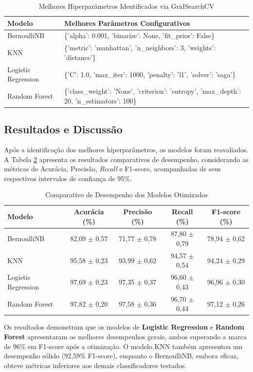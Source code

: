 \begin{table}[htbp]
\centering
\caption{Melhores Hiperparâmetros Identificados via GridSearchCV}
\label{tab:melhores_parametros}
\begin{tabular}{|l|p{10cm}|}
\hline
\textbf{Modelo} & \textbf{Melhores Parâmetros Configurativos} \\ \hline
BernoulliNB & \{'alpha': 0.001, 'binarize': None, 'fit\_prior': False\} \\ \hline
KNN & \{'metric': 'manhattan', 'n\_neighbors': 3, 'weights': 'distance'\} \\ \hline
Logistic Regression & \{'C': 1.0, 'max\_iter': 1000, 'penalty': 'l1', 'solver': 'saga'\} \\ \hline
Random Forest & \{'class\_weight': 'None', 'criterion': 'entropy', 'max\_depth': 20, 'n\_estimators': 100\} \\ \hline
\end{tabular}
\end{table}

\subsection{Resultados e Discussão} \label{subsec:resultados}

Após a identificação dos melhores hiperparâmetros, os modelos foram reavaliados. A Tabela \ref{tab:comparativo_modelos} apresenta os resultados comparativos de desempenho, considerando as métricas de Acurácia, Precisão, \textit{Recall} e F1-score, acompanhadas de seus respectivos intervalos de confiança de 95\%.

\begin{table}[htbp]
	\centering
	\caption{Comparativo de Desempenho dos Modelos Otimizados}
	\label{tab:comparativo_modelos}
	\begin{tabular}{|l|c|c|c|c|}
		\hline
		\textbf{Modelo} & \textbf{Acurácia (\%)} & \textbf{Precisão (\%)} & \textbf{Recall (\%)} & \textbf{F1-score (\%)} \\ \hline
		BernoulliNB & 82,09 $\pm$ 0,57 & 71,77 $\pm$ 0,78 & 87,80 $\pm$ 0,79 & 78,94 $\pm$ 0,62 \\ \hline
		KNN & 95,58 $\pm$ 0,23 & 93,99 $\pm$ 0,62 & 94,57 $\pm$ 0,54 & 94,24 $\pm$ 0,29 \\ \hline
		Logistic Regression & 97,69 $\pm$ 0,23 & 97,35 $\pm$ 0,37 & 96,60 $\pm$ 0,43 & 96,96 $\pm$ 0,30 \\ \hline
		Random Forest & 97,82 $\pm$ 0,20 & 97,58 $\pm$ 0,36 & 96,70 $\pm$ 0,44 & 97,12 $\pm$ 0,26 \\ \hline
	\end{tabular}
\end{table}

Os resultados demonstram que os modelos de \textbf{Logistic Regression} e \textbf{Random Forest} apresentaram os melhores desempenhos gerais, ambos superando a marca de 96\% em F1-score após a otimização. O modelo KNN também apresentou um desempenho sólido (92,59\% F1-score), enquanto o BernoulliNB, embora eficaz, obteve métricas inferiores aos demais classificadores testados.
